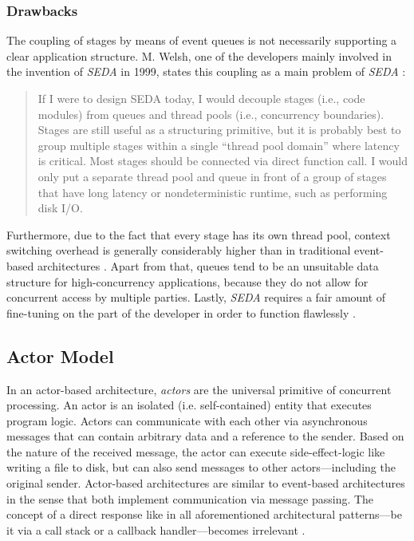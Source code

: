 \subsubsection*{Drawbacks}
The coupling of stages by means of event queues is not necessarily supporting a clear application structure. M. Welsh, one of the developers mainly involved in the invention of \textit{SEDA} in 1999, states this coupling as a main problem of \textit{SEDA} \cite{seda}: 

\begin{quote}
If I were to design SEDA today, I would decouple stages (i.e., code modules) from queues and thread pools (i.e., concurrency boundaries). Stages are still useful as a structuring primitive, but it is probably best to group multiple stages within a single ``thread pool domain'' where latency is critical. Most stages should be connected via direct function call. I would only put a separate thread pool and queue in front of a group of stages that have long latency or nondeterministic runtime, such as performing disk I/O.
\end{quote}

Furthermore, due to the fact that every stage has its own thread pool, context switching overhead is generally considerably higher than in traditional event-based architectures \cite{seda}. Apart from that, queues tend to be an unsuitable data structure for high-concurrency applications, because they do not allow for concurrent access by multiple parties. Lastly, \textit{SEDA} requires a fair amount of fine-tuning on the part of the developer in order to function flawlessly \cite{event-architecture}.

\subsection{Actor Model}
\label{lab:actormodel}
In an actor-based architecture, \textit{actors} are the universal primitive of concurrent processing. An actor is an isolated (i.e. self-contained) entity that executes program logic. Actors can communicate with each other via asynchronous messages that can contain arbitrary data and a reference to the sender. Based on the nature of the received message, the actor can execute side-effect-logic like writing a file to disk, but can also send messages to other actors---including the original sender. Actor-based architectures are similar to event-based architectures in the sense that both implement communication via message passing. The concept of a direct response like in all aforementioned architectural patterns---be it via a call stack or a callback handler---becomes irrelevant \cite{Haller2006}.

